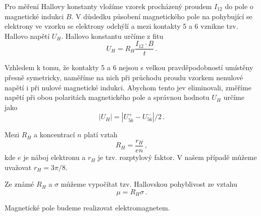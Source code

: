 Pro měření Hallovy konstanty vložíme vzorek procházený proudem $I_{12}$ do pole o magnetické indukci $B$.
V důsledku působení magnetického pole na pohybující se elektrony ve vzorku se elektrony odchýlí a mezi kontakty 5 a 6 vznikne tzv. Hallovo napětí $U_H$.
Hallovo konstantu určíme z fitu \cite{skripta}
\begin{equation}
U_H=R_H\frac{I_{12} \cdot B}{t} \,.
\end{equation}

Vzhledem k tomu, že kontakty 5 a 6 nejsou s velkou pravděpodobností umístěny přesně symetricky, naměříme na nich při průchodu proudu vzorkem nenulové napětí i při nulové magnetické indukci.
Abychom tento jev eliminovali, změříme napětí při obou polaritách magnetického pole a správnou hodnotu $U_H$ určíme jako
\begin{equation}
| U_H |=|U_{56}^+ - U_{56}^-|/2 \,.
\end{equation}

Mezi $R_H$ a koncentrací $n$ platí vztah \cite{skripta}
\begin{equation} \label{eq:koncentrace}
R_H = \frac{r_H}{en} \,,
\end{equation}
kde $e$ je náboj elektronu a $r_H$ je tzv. rozptylový faktor.
V našem případě můžeme uvažovat $r_H = 3\pi/8$. \cite{skripta}

Ze známé $R_H$ a $\sigma$ můžeme vypočítat tzv. Hallovskou pohyblivost ze vztahu \cite{skripta}
\begin{equation} \label{eq:pohyblivost}
\mu = R_H \sigma \,.
\end{equation}

Magnetické pole budeme realizovat elektromagnetem.